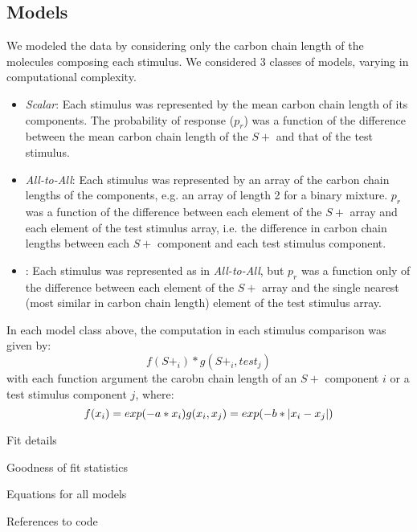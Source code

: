 \subsection*{Models}
\label{sec:methods_models}

We modeled the data by considering only the carbon chain length of the molecules composing each stimulus.  
We considered 3 classes of models, varying in computational complexity.  
\begin{itemize}
\item \textit{Scalar}: Each stimulus was represented by the mean carbon chain length of its components.  The probability of response ($p_r$) was a function of the difference between the mean carbon chain length of the $S+$ and that of the test stimulus.  
\item \textit{All-to-All}: Each stimulus was represented by an array of the carbon chain lengths of the components, e.g. an array of length 2 for a binary mixture. $p_r$ was a function of the difference between each element of the $S+$ array and each element of the test stimulus array, i.e. the difference in carbon chain lengths between each $S+$ component and each test stimulus component.  
\item {}: Each stimulus was represented as in \textit{All-to-All}, but $p_r$ was a function only of the difference between each element of the $S+$ array and the single nearest (most similar in carbon chain length) element of the test stimulus array.  
\end{itemize}

In each model class above, the computation in each stimulus comparison was given by: 
\begin{equation}
f(S+_i) * g(S+_i,test_j)
\end{equation}
with each function argument the carobn chain length of an $S+$ component $i$ or a test stimulus component $j$, where:
\begin{equation}
f(x_i) = exp(-a*x_i) \\
g(x_i,x_j) = exp(-b*|x_i-x_j|)
\end{equation}

\item Fit details
\item Goodness of fit statistics
\item Equations for all models
\item References to code
